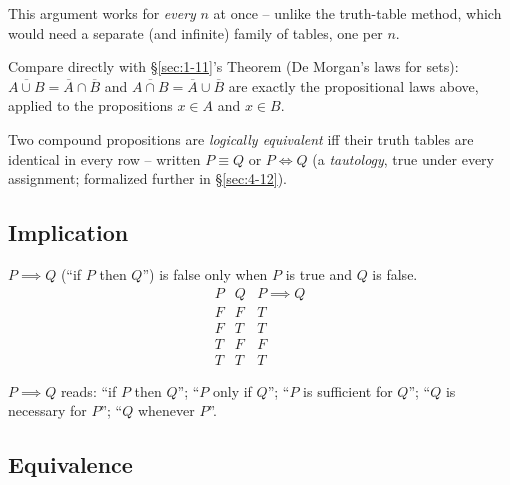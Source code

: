 \begin{note}
This argument works for \emph{every} $n$ at once -- unlike the truth-table method, which would need a separate (and infinite) family of tables, one per $n$.
\end{note}

\bigskip
\begin{note}
Compare directly with \S\ref{sec:1-11}'s Theorem (De Morgan's laws for sets): $\overline{A\cup B} = \overline A \cap \overline B$ and $\overline{A\cap B} = \overline A \cup \overline B$ are exactly the propositional laws above, applied to the propositions $x\in A$ and $x\in B$.
\end{note}

\bigskip
\begin{note}
Two compound propositions are \emph{logically equivalent} iff their truth tables are identical in every row -- written $P \equiv Q$ or $P \iff Q$ (a \emph{tautology}, true under every assignment; formalized further in \S\ref{sec:4-12}).
\end{note}

\subsection{Implication}
\label{sec:4-9}

\begin{definition}[Implication]
$P \implies Q$ (``if $P$ then $Q$'') is false only when $P$ is true and $Q$ is false.
\[
\begin{array}{cc|c}
P & Q & P \implies Q \\ \hline
F & F & T \\
F & T & T \\
T & F & F \\
T & T & T
\end{array}
\]
\end{definition}

\begin{note}
$P \implies Q$ reads: ``if $P$ then $Q$''; ``$P$ only if $Q$''; ``$P$ is sufficient for $Q$''; ``$Q$ is necessary for $P$''; ``$Q$ whenever $P$''.
\end{note}

\subsection{Equivalence}
\label{sec:4-10}

